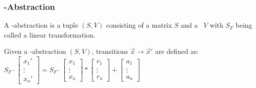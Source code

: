 \begin{frame}
	\frametitle{\qvasr-Abstraction}
	\newcommand{\s}{\ensuremath{\begin{bmatrix} s_x & s_y & s_z \end{bmatrix}}}
	\newcommand{\p}{\ensuremath{\begin{bmatrix} x' \\ y' \\ z' \end{bmatrix}}}
	\newcommand{\up}{\ensuremath{\begin{bmatrix} x \\ y \\ z \end{bmatrix}}}
	\begin{definition}
		A \qvasr-abstraction is a tuple $(S, V)$ consisting of a matrix $S$ and a \qvasr\ $V$ with $S_F$ being called a linear transformation.
	\end{definition}
	\begin{center}
	Given a \qvasr-abstraction $(S, V)$, transitions $\vec{x} \rightarrow \vec{x}'$ are defined as: \\
		$ 
		S_F \cdot
		\begin{bmatrix}
			x_1' \\
			\vdots \\
			x_n'
		\end{bmatrix}
		=
		S_F \cdot
		\begin{bmatrix}
			x_1 \\
			\vdots \\
			x_n
		\end{bmatrix}
		*
			\begin{bmatrix}
				r_1 \\
				\vdots \\
				r_n
			\end{bmatrix}
		+
		\begin{bmatrix}
			a_1 \\
			\vdots \\
			a_n
		\end{bmatrix}	
		$
	\end{center}
\end{frame}


